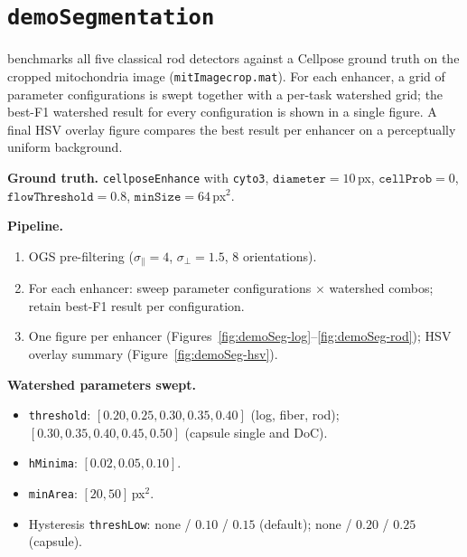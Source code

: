 \documentclass[a4paper, justified]{tufte-book}
\begin{document}
\section{\texttt{demoSegmentation}}
\label{sec:demoSeg}

 benchmarks all five classical rod detectors against a
Cellpose ground truth on the cropped mitochondria image
(\texttt{mitImagecrop.mat}).  For each enhancer, a grid of parameter
configurations is swept together with a per-task watershed grid; the
best-\mbox{F1} watershed result for every configuration is shown in a single
figure.  A final HSV overlay figure compares the best result per enhancer
on a perceptually uniform background.

\medskip
\noindent\textbf{Ground truth.}\quad
\texttt{cellposeEnhance} with \texttt{cyto3}, $\mathtt{diameter}=10$\,px,
$\mathtt{cellProb}=0$, $\mathtt{flowThreshold}=0.8$,
$\mathtt{minSize}=64$\,px$^2$.

\medskip
\noindent\textbf{Pipeline.}
\begin{enumerate}
  \item OGS pre-filtering ($\sigma_\parallel=4$, $\sigma_\perp=1.5$,
        8 orientations).
  \item For each enhancer: sweep parameter configurations $\times$ watershed
        combos; retain best-\mbox{F1} result per configuration.
  \item One figure per enhancer (Figures~\ref{fig:demoSeg-log}--\ref{fig:demoSeg-rod});
        HSV overlay summary (Figure~\ref{fig:demoSeg-hsv}).
\end{enumerate}

\noindent\textbf{Watershed parameters swept.}


\begin{itemize}
  \item \texttt{threshold}: $[0.20, 0.25, 0.30, 0.35, 0.40]$ (log, fiber,
        rod); $[0.30, 0.35, 0.40, 0.45, 0.50]$ (capsule single and DoC).
  \item \texttt{hMinima}: $[0.02, 0.05, 0.10]$.
  \item \texttt{minArea}: $[20, 50]$\,px$^2$.
  \item Hysteresis \texttt{threshLow}: none / $0.10$ / $0.15$ (default);
        none / $0.20$ / $0.25$ (capsule).
\end{itemize}
\end{document}
